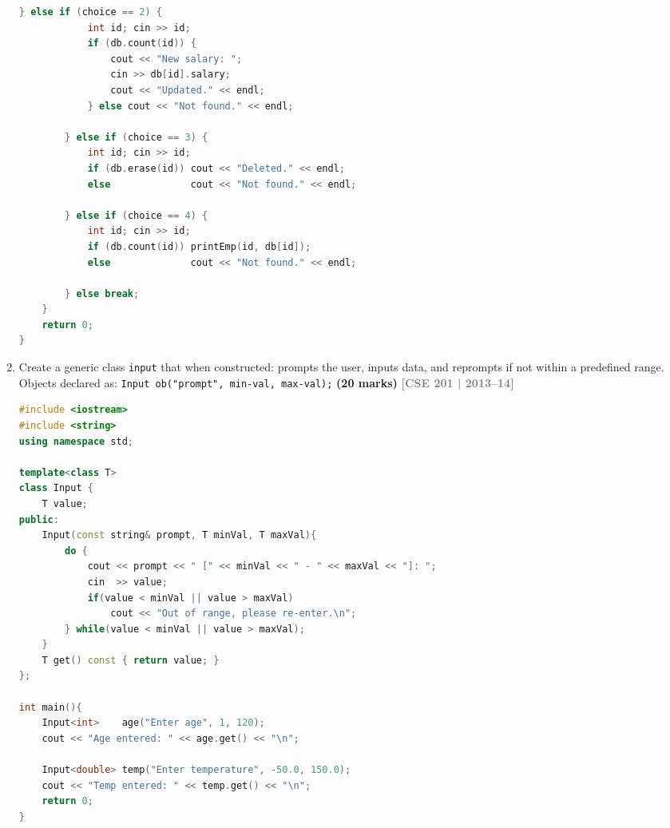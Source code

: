 \documentclass[12pt,a3paper]{article}
\newcommand{\yr}[1]{\hfill\textcolor{gray}{\small\textbf{[#1]}}}
\newcommand{\mk}[1]{\textcolor{orange!70!black}{\small\textbf{(#1 marks)}}}
\begin{document}
\begin{enumerate}
\begin{tcolorbox}[enhanced,breakable,ansbox,
  colback=cH!4,colframe=cH,boxrule=0.8pt,arc=5pt,
  title={\textbf{Answer --- Interactive Employee Database Using map}},
  fonttitle=\bfseries\color{white},colbacktitle=cH]
\begin{lstlisting}[language=C++]
        } else if (choice == 2) {
            int id; cin >> id;
            if (db.count(id)) {
                cout << "New salary: ";
                cin >> db[id].salary;
                cout << "Updated." << endl;
            } else cout << "Not found." << endl;

        } else if (choice == 3) {
            int id; cin >> id;
            if (db.erase(id)) cout << "Deleted." << endl;
            else              cout << "Not found." << endl;

        } else if (choice == 4) {
            int id; cin >> id;
            if (db.count(id)) printEmp(id, db[id]);
            else              cout << "Not found." << endl;

        } else break;
    }
    return 0;
}
\end{lstlisting}
\end{tcolorbox}

\item Create a generic class \texttt{input} that when constructed: prompts the user, inputs data, and reprompts if not within a predefined range. Objects declared as: \texttt{Input ob("prompt", min-val, max-val);} \mk{20}
\yr{CSE 201 | 2013--14}
\begin{tcolorbox}[enhanced,breakable,ansbox,colback=cH!4,colframe=cH,
  boxrule=0.8pt,arc=5pt,
  title={\textbf{Answer --- Generic input class with range validation}},
  fonttitle=\bfseries\color{white},colbacktitle=cH]

\begin{lstlisting}[language=C++]
#include <iostream>
#include <string>
using namespace std;

template<class T>
class Input {
    T value;
public:
    Input(const string& prompt, T minVal, T maxVal){
        do {
            cout << prompt << " [" << minVal << " - " << maxVal << "]: ";
            cin  >> value;
            if(value < minVal || value > maxVal)
                cout << "Out of range, please re-enter.\n";
        } while(value < minVal || value > maxVal);
    }
    T get() const { return value; }
};

int main(){
    Input<int>    age("Enter age", 1, 120);
    cout << "Age entered: " << age.get() << "\n";

    Input<double> temp("Enter temperature", -50.0, 150.0);
    cout << "Temp entered: " << temp.get() << "\n";
    return 0;
}
\end{lstlisting}


\end{tcolorbox}
\end{enumerate}
\end{document}
